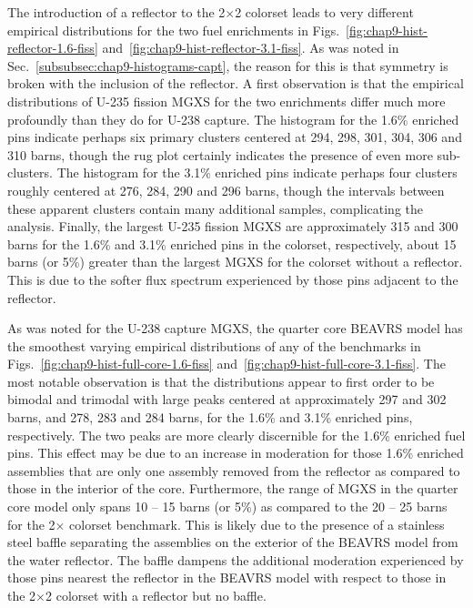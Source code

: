 The introduction of a reflector to the 2$\times$2 colorset leads to very different empirical distributions for the two fuel enrichments in Figs.~\ref{fig:chap9-hist-reflector-1.6-fiss} and~\ref{fig:chap9-hist-reflector-3.1-fiss}. As was noted in Sec.~\ref{subsubsec:chap9-histograms-capt}, the reason for this is that symmetry is broken with the inclusion of the reflector. A first observation is that the empirical distributions of U-235 fission \ac{MGXS} for the two enrichments differ much more profoundly than they do for U-238 capture. The histogram for the 1.6\% enriched pins indicate perhaps six primary clusters centered at 294, 298, 301, 304, 306 and 310 barns, though the rug plot certainly indicates the presence of even more sub-clusters. The histogram for the 3.1\% enriched pins indicate perhaps four clusters roughly centered at 276, 284, 290 and 296 barns, though the intervals between these apparent clusters contain many additional samples, complicating the analysis. Finally, the largest U-235 fission \ac{MGXS} are approximately 315 and 300 barns for the 1.6\% and 3.1\% enriched pins in the colorset, respectively, about 15 barns (or 5\%) greater than the largest \ac{MGXS} for the colorset without a reflector. This is due to the softer flux spectrum experienced by those pins adjacent to the reflector.

As was noted for the U-238 capture \ac{MGXS}, the quarter core \ac{BEAVRS} model has the smoothest varying empirical distributions of any of the benchmarks in Figs.~\ref{fig:chap9-hist-full-core-1.6-fiss} and~\ref{fig:chap9-hist-full-core-3.1-fiss}. The most notable observation is that the distributions appear to first order to be bimodal and trimodal with large peaks centered at approximately 297 and 302 barns, and 278, 283 and 284 barns, for the 1.6\% and 3.1\% enriched pins, respectively. The two peaks are more clearly discernible for the 1.6\% enriched fuel pins. This effect may be due to an increase in moderation for those 1.6\% enriched assemblies that are only one assembly removed from the reflector as compared to those in the interior of the core. Furthermore, the range of \ac{MGXS} in the quarter core model only spans 10 -- 15 barns (or 5\%) as compared to the 20 -- 25 barns for the 2$\times$ colorset benchmark. This is likely due to the presence of a stainless steel baffle separating the assemblies on the exterior of the \ac{BEAVRS} model from the water reflector. The baffle dampens the additional moderation experienced by those pins nearest the reflector in the \ac{BEAVRS} model with respect to those in the 2$\times$2 colorset with a reflector but no baffle.

